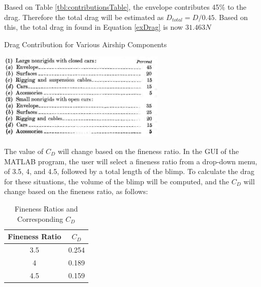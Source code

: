 \documentclass[../main.tex]{subfiles}
\begin{document}
Based on Table \ref{tbl:contributionsTable}, the envelope contributes 45\% to the drag. Therefore the total drag will be estimated as $D_{total}=D/0.45$. Based on this, the total drag in found in Equation \ref{exDrag} is now $31.463N$

\begin{table}[H]
	\centering
	\caption{Drag Contribution for Various Airship Components \cite{airshipAerodynamics}}
	\includegraphics[width=.5\linewidth]{img/drag/contributions.PNG}
	\label{tbl:contributionsTable}
\end{table}

The value of $C_D$ will change based on the fineness ratio. In the GUI of the MATLAB program, the user will select a fineness ratio from a drop-down menu, of 3.5, 4, and 4.5, followed by a total length of the blimp. To calculate the drag for these situations, the volume of the blimp will be computed, and the $C_D$ will change based on the fineness ratio, as follows:
\begin{table}[H]
	\caption{Fineness Ratios and Corresponding $C_D$}
	\label{tbl:finenessCoefficient}
\begin{center}
	\begin{tabular}{|c|c|}
	\hline 
	\textbf{Fineness Ratio} & \textbf{$C_D$} \\ 
	\hline 
	3.5 & 0.254 \\ 
	\hline 
	4 & 0.189 \\ 
	\hline 
	4.5 & 0.159 \\ 
	\hline 
\end{tabular} 
\end{center}
\end{table}
\end{document}
